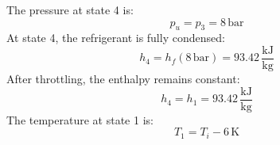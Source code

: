 The pressure at state 4 is:  
\[
p_u = p_3 = 8 \, \text{bar}
\]  
At state 4, the refrigerant is fully condensed:  
\[
h_4 = h_f(8 \, \text{bar}) = 93.42 \, \frac{\text{kJ}}{\text{kg}}
\]  
After throttling, the enthalpy remains constant:  
\[
h_4 = h_1 = 93.42 \, \frac{\text{kJ}}{\text{kg}}
\]  
The temperature at state 1 is:  
\[
T_1 = T_i - 6 \, \text{K}
\]